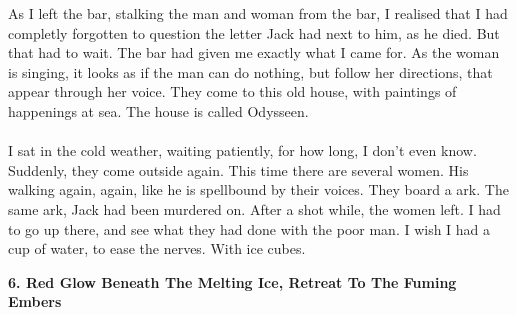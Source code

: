 \documentclass[]{article}
\begin{document}
As I left the bar, stalking the man and woman from the bar, I realised that I had completly forgotten to question the letter Jack had next to him, as he died. But that had to wait. The bar had given me exactly what I came for. As the woman is singing, it looks as if the man can do nothing, but follow her directions, that appear through her voice. They come to this old house, with paintings of happenings at sea. The house is called Odysseen.
\\ \\
I sat in the cold weather, waiting patiently, for how long, I don't even know. Suddenly, they come outside again. This time there are several women. His walking again, again, like he is spellbound by their voices. They board a ark. The same ark, Jack had been murdered on. After a shot while, the women left. I had to go up there, and see what they had done with the poor man. I wish I had a cup of water, to ease the nerves. With ice cubes.

\newpage

\begin{center}
	\large\textbf{6. Red Glow Beneath The Melting Ice, \newline Retreat To The Fuming Embers}
\end{center}
\end{document}
